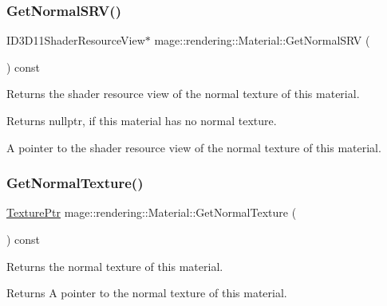 \subsubsection{\texorpdfstring{Get\+Normal\+S\+R\+V()}{GetNormalSRV()}}
{\footnotesize\ttfamily I\+D3\+D11\+Shader\+Resource\+View$\ast$ mage\+::rendering\+::\+Material\+::\+Get\+Normal\+S\+RV (\begin{DoxyParamCaption}{ }\end{DoxyParamCaption}) const\hspace{0.3cm}{\ttfamily [noexcept]}}

Returns the shader resource view of the normal texture of this material.

\begin{DoxyReturn}{Returns}
{\ttfamily nullptr}, if this material has no normal texture. 

A pointer to the shader resource view of the normal texture of this material. 
\end{DoxyReturn}
\hypertarget{classmage_1_1rendering_1_1_material_a1ae7786ebd627d3e7ecaf2dc671f497d}{}\label{classmage_1_1rendering_1_1_material_a1ae7786ebd627d3e7ecaf2dc671f497d} 
\subsubsection{\texorpdfstring{Get\+Normal\+Texture()}{GetNormalTexture()}}
{\footnotesize\ttfamily \hyperlink{namespacemage_1_1rendering_a6f3ae54f825328465b0cdde0f0de4a36}{Texture\+Ptr} mage\+::rendering\+::\+Material\+::\+Get\+Normal\+Texture (\begin{DoxyParamCaption}{ }\end{DoxyParamCaption}) const\hspace{0.3cm}{\ttfamily [noexcept]}}

Returns the normal texture of this material.

\begin{DoxyReturn}{Returns}
A pointer to the normal texture of this material. 
\end{DoxyReturn}
\hypertarget{classmage_1_1rendering_1_1_material_a4c950a1b95e14246027de8ff0da4d55a}{}\label{classmage_1_1rendering_1_1_material_a4c950a1b95e14246027de8ff0da4d55a} 

